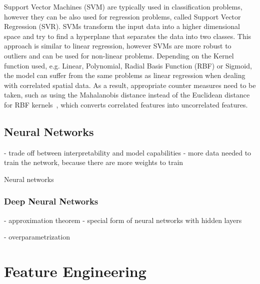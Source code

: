 Support Vector Machines (SVM) are typically used in classification problems, however they can be also used for regression problems, called Support Vector Regression (SVR). SVMs transform the input data into a higher dimensional space and try to find a hyperplane that separates the data into two classes. This approach is similar to linear regression, however SVMs are more robust to outliers and can be used for non-linear problems. Depending on the Kernel function used, e.g. Linear, Polynomial, Radial Basis Function (RBF) or Sigmoid, the model can suffer from the same problems as linear regression when dealing with correlated spatial data.
As a result, appropriate counter measures need to be taken, such as using the Mahalanobis distance instead of the Euclidean distance for RBF kernels~\cite{kamada2006support}, which converts correlated features into uncorrelated features.

\subsection{Neural Networks}

- trade off between interpretability and model capabilities
- more data needed to train the network, because there are more weights to train

Neural networks 

\subsubsection{Deep Neural Networks}
 
- approximation theorem
- special form of neural networks with hidden layers

- overparametrization


\section{Feature Engineering}

